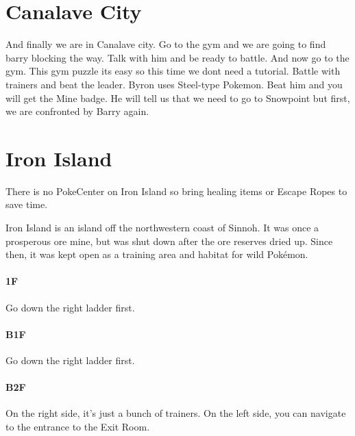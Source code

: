 \documentclass[11pt]{article}
\begin{document}


\section{Canalave City}\label{sec:canalave-city}
And finally we are in Canalave city.
Go to the gym and we are going to find barry blocking the way.
Talk with him and be ready to battle.
And now go to the gym.
This gym puzzle its easy so this time we dont need a tutorial.
Battle with trainers and beat the leader.
Byron uses Steel-type Pokemon.
Beat him and you will get the Mine badge.
He will tell us that we need to go to Snowpoint but first,
we are confronted by Barry again.

\section{Iron Island}\label{sec:iron-island}
There is no PokeCenter on Iron Island so bring healing items or Escape Ropes to save time.

Iron Island is an island off the northwestern coast of Sinnoh.
It was once a prosperous ore mine, but was shut down after the ore reserves dried up.
Since then, it was kept open as a training area and habitat for wild Pokémon.

% 

\paragraph{1F}
Go down the right ladder first.



\paragraph{B1F}
Go down the right ladder first.




\paragraph{B2F}
On the right side, it's just a bunch of trainers.
On the left side, you can navigate to the entrance to the Exit Room.



\end{document}

